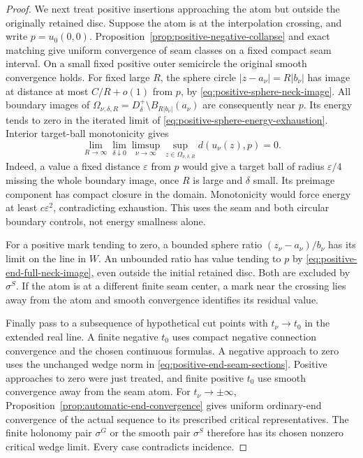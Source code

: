 \documentclass[11pt]{amsart}
\theoremstyle{definition}
\theoremstyle{remark}
\theoremstyle{plain}
\begin{document}
\begin{proof}
We next treat positive insertions approaching the atom but
outside the originally retained disc. Suppose the atom is
at the interpolation crossing, and write $p=u_0(0,0)$.
Proposition~\ref{prop:positive-negative-collapse} and exact
matching give uniform convergence of seam classes on a
fixed compact seam interval. On a small fixed positive
outer semicircle the original smooth convergence holds.
For fixed large $R$, the sphere circle
$|z-a_\nu|=R|b_\nu|$ has image at distance at most
$C/R+o(1)$ from $p$, by
\eqref{eq:positive-sphere-neck-image}.
All boundary images of
$\Omega_{\nu,\delta,R}=D_\delta^+\setminus
B_{R|b_\nu|}(a_\nu)$ are consequently near $p$.
Its energy tends to zero in the iterated limit of
\eqref{eq:positive-sphere-energy-exhaustion}.
Interior target-ball monotonicity gives
\begin{equation}\label{eq:positive-end-full-neck-image}
 \lim_{R\to\infty}\lim_{\delta\downarrow0}
       \limsup_{\nu\to\infty}
       \sup_{z\in\Omega_{\nu,\delta,R}}d(u_\nu(z),p)=0.
\end{equation}
Indeed, a value a fixed distance $\varepsilon$ from $p$
would give a target ball of radius $\varepsilon/4$ missing
the whole boundary image, once $R$ is large and $\delta$
small. Its preimage component has compact closure in the
domain. Monotonicity would force energy at least
$c\varepsilon^2$, contradicting exhaustion.
This uses the seam and both circular boundary controls,
not energy smallness alone.

For a positive mark tending to zero, a bounded sphere ratio
$(z_\nu-a_\nu)/b_\nu$ has its limit on the line in $W$.
An unbounded ratio has value tending to $p$ by
\eqref{eq:positive-end-full-neck-image}, even outside the
initial retained disc. Both are excluded by $\sigma^S$.
If the atom is at a different finite seam center, a mark
near the crossing lies away from the atom and smooth
convergence identifies its residual value.

Finally pass to a subsequence of hypothetical cut points
with $t_\nu\to t_0$ in the extended real line. A finite
negative $t_0$ uses compact negative connection convergence
and the chosen continuous formulas. A negative approach
to zero uses the unchanged wedge norm in
\eqref{eq:positive-end-seam-sections}. Positive approaches
to zero were just treated, and finite positive $t_0$ use
smooth convergence away from the seam atom.
For $t_\nu\to\pm\infty$,
Proposition~\ref{prop:automatic-end-convergence} gives
uniform ordinary-end convergence of the actual sequence
to its prescribed critical representatives. The finite
holonomy pair $\sigma^G$ or the smooth pair $\sigma^S$
therefore has its chosen nonzero critical wedge limit.
Every case contradicts incidence.
\end{proof}
\end{document}
